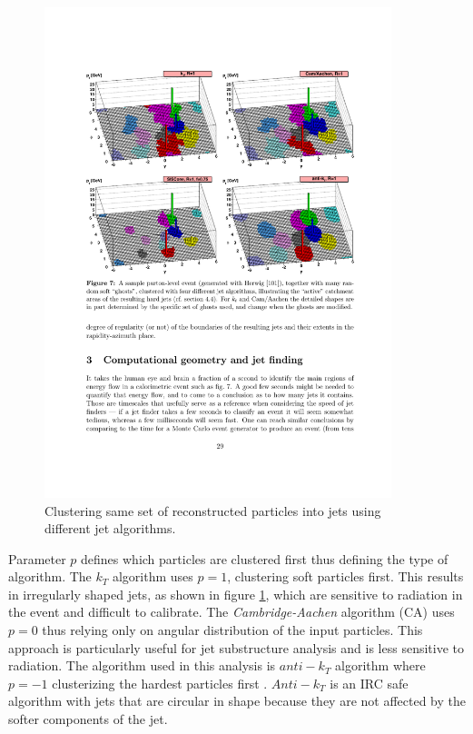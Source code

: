 \begin{figure}[htbp]
	\centering
		\includegraphics[width=0.9\textwidth]{Figures/diff_algos.pdf}
	\caption[Clustering particles into jets with different algorithms.]{Clustering same set of reconstructed particles into jets using different jet algorithms. \cite{Salam:2009jx}}
	\label{fig:jetAlgos}
\end{figure}
\par Parameter $p$ defines which particles are clustered first thus defining the type of algorithm. The $k_T$ algorithm uses $p=1$, clustering soft particles first. This results in irregularly shaped jets, as shown in figure \ref{fig:jetAlgos}, which are sensitive to radiation in the event and difficult to calibrate. The \textit{Cambridge-Aachen} algorithm (CA) uses $p=0$ thus relying only on angular distribution of the input particles. This approach is particularly useful for jet substructure analysis and is less sensitive to radiation. The algorithm used in this analysis is $anti-k_T$ algorithm where $p=-1$ clusterizing the hardest particles first \cite{Cacciari:2008gp}. $Anti-k_T$ is an IRC safe algorithm with jets that are circular in shape because they are not affected by the softer components of the jet.       


